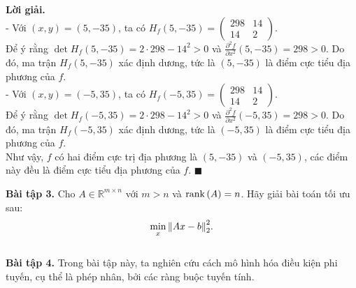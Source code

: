 \documentclass[12pt]{article}
\newcommand{\R}{\mathbb{R}}
\newenvironment{solution}{%
     \setlength\parindent{0pt}\par\medskip\textbf{Lời giải.}\quad}{%
     \hfill\tiny$\blacksquare$\par\medskip}
\begin{document}
\begin{solution}
        \\
        - Với $(x, y) = (5, -35)$, ta có $H_f(5, -35) = \begin{pmatrix}
            298 & 14\\
            14 & 2
        \end{pmatrix}$.
        \\
        Để ý rằng $\det{H_f(5, -35)} = 2 \cdot 298 - 14^2 > 0$ và $\frac{\partial^2 f}{\partial x^2}(5, -35) = 298 > 0$. Do đó, ma trận $H_f(5, -35)$ xác định dương, tức là $(5, -35)$ là điểm cực tiểu địa phương của $f$.
        \\
        - Với $(x, y) = (-5, 35)$, ta có $H_f(-5, 35) = \begin{pmatrix}
            298 & 14\\
            14 & 2
        \end{pmatrix}$.
        \\
        Để ý rằng $\det{H_f(-5, 35)} = 2 \cdot 298 - 14^2 > 0$ và $\frac{\partial^2 f}{\partial x^2}(-5, 35) = 298 > 0$. Do đó, ma trận $H_f(-5, 35)$ xác định dương, tức là $(-5, 35)$ là điểm cực tiểu địa phương của $f$.
        \\
        Như vậy, $f$ có hai điểm cực trị địa phương là $(5, -35)$ và $(-5, 35)$, các điểm này đều là điểm cực tiểu địa phương của $f$.
    \end{solution}
    \textbf{Bài tập 3.} Cho $A \in \R^{m \times n}$ với $m > n$ và $\rank{(A)} = n$. Hãy giải bài toán tối ưu sau:
    \begin{align*}
        \min\limits_{x} {\norm{Ax - b}_2^2}.
    \end{align*}
    \\
    \textbf{Bài tập 4.} Trong bài tập này, ta nghiên cứu cách mô hình hóa điều kiện phi tuyến, cụ thể là
    phép nhân, bởi các ràng buộc tuyến tính.
\end{document}

